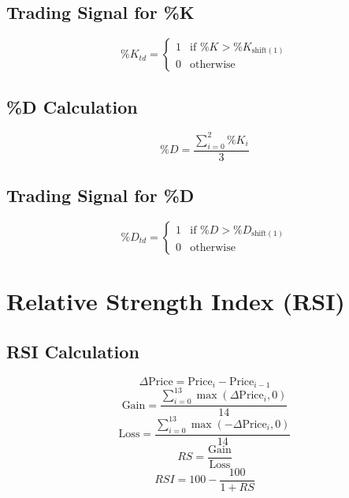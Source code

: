 \documentclass{article}
\begin{document}
\subsection{Trading Signal for \%K}
\begin{equation}
\%K_{td} = 
\begin{cases} 
1 & \text{if } \%K > \%K_{\text{shift}(1)} \\
0 & \text{otherwise}
\end{cases}
\end{equation}

\subsection{\%D Calculation}
\begin{equation}
\%D = \frac{\sum_{i=0}^{2} \%K_i}{3}
\end{equation}

\subsection{Trading Signal for \%D}
\begin{equation}
\%D_{td} = 
\begin{cases} 
1 & \text{if } \%D > \%D_{\text{shift}(1)} \\
0 & \text{otherwise}
\end{cases}
\end{equation}

\section{Relative Strength Index (RSI)}

\subsection{RSI Calculation}
\begin{equation}
\Delta \text{Price} = \text{Price}_{i} - \text{Price}_{i-1}
\end{equation}
\begin{equation}
\text{Gain} = \frac{\sum_{i=0}^{13} \max(\Delta \text{Price}_i, 0)}{14}
\end{equation}
\begin{equation}
\text{Loss} = \frac{\sum_{i=0}^{13} \max(-\Delta \text{Price}_i, 0)}{14}
\end{equation}
\begin{equation}
RS = \frac{\text{Gain}}{\text{Loss}}
\end{equation}
\begin{equation}
RSI = 100 - \frac{100}{1 + RS}
\end{equation}
\end{document}
